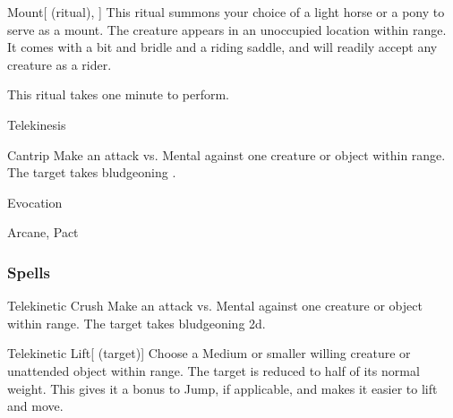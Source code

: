 \lowercase{\hypertarget{spell:Mount}{}}\label{spell:Mount}
\begin{ability}[\nth{2}]{\hypertarget{spell:Mount}{Mount}}[ (ritual), ]
This ritual summons your choice of a light horse or a pony to serve as a mount.
The creature appears in an unoccupied location within \rngclose range.
It comes with a bit and bridle and a riding saddle, and will readily accept any creature as a rider.

This ritual takes one minute to perform.
\end{ability}
\vspace{0.25em}


\newpage
\begin{spellsection}{Telekinesis}

\begin{spellheader}
\end{spellheader}


\begin{ability}{Cantrip}
Make an attack vs. Mental against one creature or object within \rngmed range.
\hit The target takes bludgeoning .
\end{ability}




 Evocation

 Arcane, Pact
\end{spellsection}


\subsubsection{Spells}


\lowercase{\hypertarget{spell:Telekinetic Crush}{}}\label{spell:Telekinetic Crush}
\begin{ability}[\nth{1}]{\hypertarget{spell:Telekinetic Crush}{Telekinetic Crush}}
Make an attack vs. Mental against one creature or object within \rngmed range.
\hit The target takes bludgeoning  \plus2d.
\end{ability}
\vspace{0.25em}



\lowercase{\hypertarget{spell:Telekinetic Lift}{}}\label{spell:Telekinetic Lift}
\begin{ability}[\nth{1}]{\hypertarget{spell:Telekinetic Lift}{Telekinetic Lift}}[ (target)]
Choose a Medium or smaller willing creature or unattended object within \rngclose range.
The target is reduced to half of its normal weight.
This gives it a  bonus to Jump, if applicable, and makes it easier to lift and move.
\end{ability}
\vspace{0.25em}



